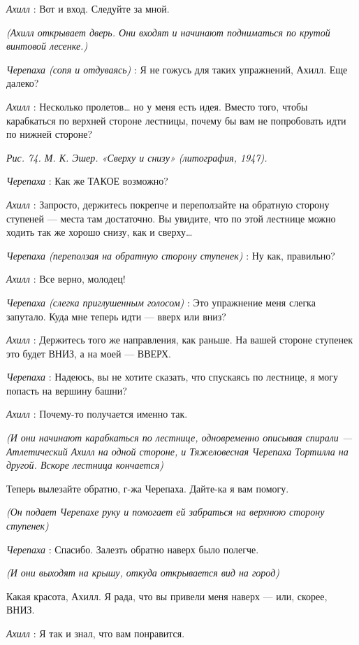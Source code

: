\emph{Ахилл} : Вот и вход. Следуйте за мной.

\emph{(Ахилл открывает дверь. Они входят и начинают подниматься по крутой винтовой лесенке.)}

\emph{Черепаха (сопя и отдуваясь)} : Я не гожусь для таких упражнений, Ахилл. Еще далеко?

\emph{Ахилл} : Несколько пролетов\ldots{} но у меня есть идея. Вместо того, чтобы карабкаться по верхней стороне лестницы, почему бы вам не попробовать идти по нижней стороне?

\emph{Рис. 74. М. К. Эшер. «Сверху и снизу» (литография, 1947).}

\emph{Черепаха} : Как же ТАКОЕ возможно?

\emph{Ахилл} : Запросто, держитесь покрепче и переползайте на обратную сторону ступеней --- места там достаточно. Вы увидите, что по этой лестнице можно ходить так же хорошо снизу, как и сверху\ldots{}

\emph{Черепаха (переползая на обратную сторону ступенек)} : Ну как, правильно?

\emph{Ахилл} : Все верно, молодец!

\emph{Черепаха (слегка приглушенным голосом)} : Это упражнение меня слегка запутало. Куда мне теперь идти --- вверх или вниз?

\emph{Ахилл} : Держитесь того же направления, как раньше. На вашей стороне ступенек это будет ВНИЗ, а на моей --- ВВЕРХ.

\emph{Черепаха} : Надеюсь, вы не хотите сказать, что спускаясь по лестнице, я могу попасть на вершину башни?

\emph{Ахилл} : Почему-то получается именно так.

\emph{(И они начинают карабкаться по лестнице, одновременно описывая спирали --- Атлетический Ахилл на одной стороне, и Тяжеловесная Черепаха Тортилла на другой. Вскоре лестница кончается)}

Теперь вылезайте обратно, г-жа Черепаха. Дайте-ка я вам помогу.

\emph{(Он подает Черепахе руку и помогает ей забраться на верхнюю сторону ступенек)}

\emph{Черепаха} : Спасибо. Залезть обратно наверх было полегче.

\emph{(И они выходят на крышу, откуда открывается вид на город)}

Какая красота, Ахилл. Я рада, что вы привели меня наверх --- или, скорее, ВНИЗ.

\emph{Ахилл} : Я так и знал, что вам понравится.

